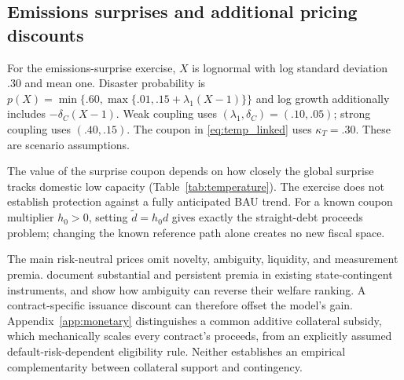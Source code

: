 \documentclass[11pt]{article}
\begin{document}
\subsection{Emissions surprises and additional pricing discounts}\label{subsec:temperature}
For the emissions-surprise exercise, $X$ is lognormal with log standard deviation .30 and mean one. Disaster probability is $p(X)=\min\{.60,\max\{.01,.15+\lambda_1(X-1)\}\}$ and log growth additionally includes $-\delta_C(X-1)$. Weak coupling uses $(\lambda_1,\delta_C)=(.10,.05)$; strong coupling uses $(.40,.15)$. The coupon in \eqref{eq:temp_linked} uses $\kappa_T=.30$. These are scenario assumptions.
\begin{table}[t]
\centering\caption{Insurance against unanticipated emissions increments in the stress environment. The disaster clause retains its loss threshold.}\label{tab:temperature}

\end{table}
The value of the surprise coupon depends on how closely the global surprise tracks domestic low capacity (Table~\ref{tab:temperature}). The exercise does not establish protection against a fully anticipated BAU trend. For a known coupon multiplier $h_0>0$, setting $\tilde d=h_0d$ gives exactly the straight-debt proceeds problem; changing the known reference path alone creates no new fiscal space.

The main risk-neutral prices omit novelty, ambiguity, liquidity, and measurement premia. \textcite{igan2021_premia_scdi} document substantial and persistent premia in existing state-contingent instruments, and \textcite{RochRoldan2023} show how ambiguity can reverse their welfare ranking. A contract-specific issuance discount can therefore offset the model's gain. Appendix~\ref{app:monetary} distinguishes a common additive collateral subsidy, which mechanically scales every contract's proceeds, from an explicitly assumed default-risk-dependent eligibility rule. Neither establishes an empirical complementarity between collateral support and contingency.


\end{document}
